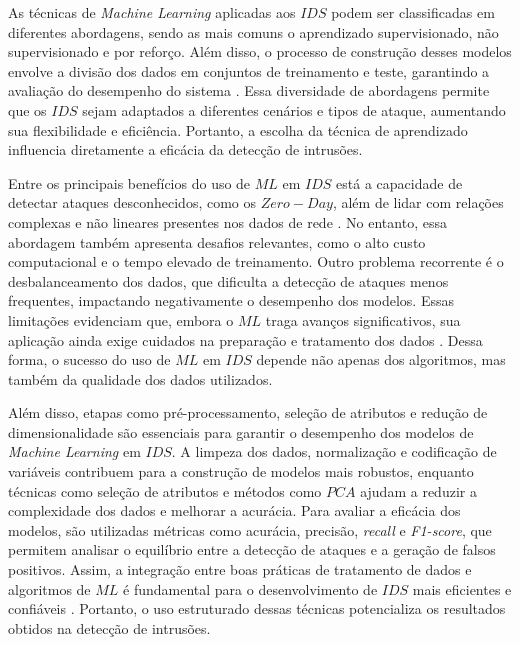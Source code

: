 \documentclass[a4paper,10pt, twocolumn]{article}
\begin{document}
As técnicas de \textit{Machine Learning} aplicadas aos $IDS$ podem ser classificadas em 
diferentes abordagens, sendo as mais comuns o aprendizado supervisionado, não 
supervisionado e por reforço. Além disso, o 
processo de construção desses modelos envolve a divisão dos dados em conjuntos 
de treinamento e teste, garantindo a avaliação do desempenho do sistema \cite{zehedi2023comparative} \cite{emad2022intrusion}. Essa 
diversidade de abordagens permite que os $IDS$ sejam adaptados a diferentes 
cenários e tipos de ataque, aumentando sua flexibilidade e eficiência. 
Portanto, a escolha da técnica de aprendizado influencia diretamente a 
eficácia da detecção de intrusões. 

Entre os principais benefícios do uso de $ML$ em $IDS$ está a capacidade de 
detectar ataques desconhecidos, como os $Zero-Day$, além de lidar com relações 
complexas e não lineares presentes nos dados de rede \cite{zehedi2023comparative} \cite{Kazi2019network}. No entanto, essa 
abordagem também apresenta desafios relevantes, como o alto custo 
computacional e o tempo elevado de treinamento. Outro problema recorrente é o 
desbalanceamento dos dados, que dificulta a detecção de ataques menos 
frequentes, impactando negativamente o desempenho dos modelos. Essas 
limitações evidenciam que, embora o $ML$ traga avanços significativos, sua 
aplicação ainda exige cuidados na preparação e tratamento dos dados \cite{zehedi2023comparative}. Dessa 
forma, o sucesso do uso de $ML$ em $IDS$ depende não apenas dos algoritmos, mas 
também da qualidade dos dados utilizados. 

Além disso, etapas como pré-processamento, seleção de atributos e redução de 
dimensionalidade são essenciais para garantir o desempenho dos modelos de 
\textit{Machine Learning} em $IDS$. A limpeza dos dados, normalização e codificação de 
variáveis contribuem para a construção de modelos mais robustos, enquanto 
técnicas como seleção de atributos e métodos como $PCA$ ajudam a reduzir a 
complexidade dos dados e melhorar a acurácia. Para avaliar a eficácia dos 
modelos, são utilizadas métricas como acurácia, precisão, \textit{recall} e \textit{F1-score}, 
que permitem analisar o equilíbrio entre a detecção de ataques e a geração de 
falsos positivos. Assim, a integração entre boas práticas de tratamento de 
dados e algoritmos de $ML$ é fundamental para o desenvolvimento de $IDS$ mais 
eficientes e confiáveis \cite{zehedi2023comparative} \cite{Thakkar2021Survey}. Portanto, o uso estruturado dessas técnicas 
potencializa os resultados obtidos na detecção de intrusões. 
\end{document}
